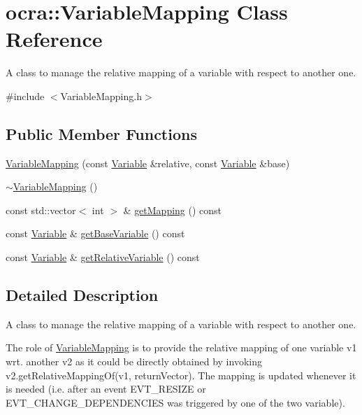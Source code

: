 \hypertarget{classocra_1_1VariableMapping}{}\section{ocra\+:\+:Variable\+Mapping Class Reference}
\label{classocra_1_1VariableMapping}


A class to manage the relative mapping of a variable with respect to another one.  




{\ttfamily \#include $<$Variable\+Mapping.\+h$>$}

\subsection*{Public Member Functions}
\begin{DoxyCompactItemize}
\item 
\hyperlink{classocra_1_1VariableMapping_a05d5789ef9b868666a9e1eaf1294369c}{Variable\+Mapping} (const \hyperlink{classocra_1_1Variable}{Variable} \&relative, const \hyperlink{classocra_1_1Variable}{Variable} \&base)
\item 
\hyperlink{classocra_1_1VariableMapping_ad27dd236ac480197c10f8bb9ab15b6bd}{$\sim$\+Variable\+Mapping} ()
\item 
const std\+::vector$<$ int $>$ \& \hyperlink{classocra_1_1VariableMapping_a6fc956f91da5658c326371f79ea4f030}{get\+Mapping} () const 
\item 
const \hyperlink{classocra_1_1Variable}{Variable} \& \hyperlink{classocra_1_1VariableMapping_acc1edcaf538173bfbdb4a2432e18e273}{get\+Base\+Variable} () const 
\item 
const \hyperlink{classocra_1_1Variable}{Variable} \& \hyperlink{classocra_1_1VariableMapping_a4075fb83837b4c02b90f4ececeb3ee98}{get\+Relative\+Variable} () const 
\end{DoxyCompactItemize}


\subsection{Detailed Description}
A class to manage the relative mapping of a variable with respect to another one. 

The role of \hyperlink{classocra_1_1VariableMapping}{Variable\+Mapping} is to provide the relative mapping of one variable v1 wrt. another v2 as it could be directly obtained by invoking v2.\+get\+Relative\+Mapping\+Of(v1, return\+Vector). The mapping is updated whenever it is needed (i.\+e. after an event E\+V\+T\+\_\+\+R\+E\+S\+I\+ZE or E\+V\+T\+\_\+\+C\+H\+A\+N\+G\+E\+\_\+\+D\+E\+P\+E\+N\+D\+E\+N\+C\+I\+ES was triggered by one of the two variable). 

